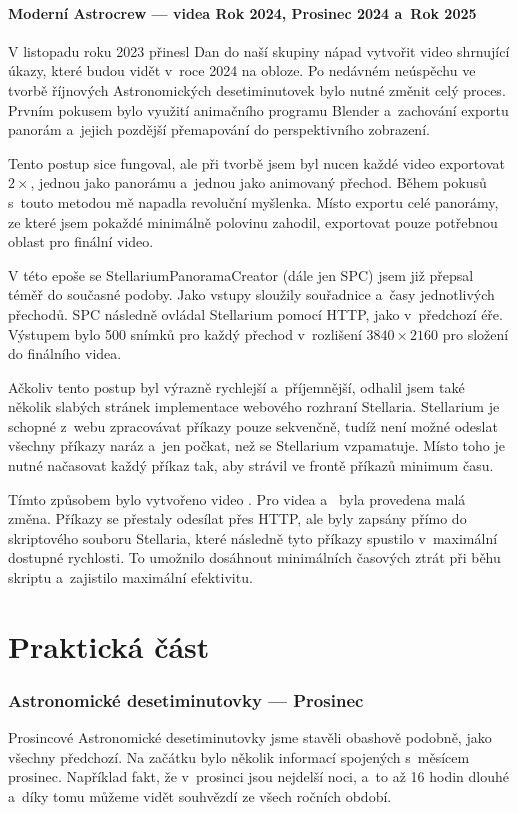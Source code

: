 \documentclass[12pt,a4paper,titlepage]{article}
\begin{document}
\subsection{Moderní Astrocrew --- videa Rok 2024, Prosinec 2024 a~Rok 2025}
V listopadu roku 2023 přinesl Dan do naší skupiny nápad vytvořit video shrnující úkazy, které budou vidět v~roce 2024 na obloze. Po nedávném neúspěchu ve tvorbě říjnových Astronomických desetiminutovek bylo nutné změnit celý proces. Prvním pokusem bylo využití animačního programu Blender a~zachování exportu panorám a~jejich pozdější přemapování do perspektivního zobrazení. 

Tento postup sice fungoval, ale při tvorbě jsem byl nucen každé video exportovat \(2\times \), jednou jako panorámu a~jednou jako animovaný přechod. Během pokusů s~touto metodou mě napadla revoluční myšlenka. Místo exportu celé panorámy, ze které jsem pokaždé minimálně polovinu zahodil, exportovat pouze potřebnou oblast pro finální video. 

V této epoše se StellariumPanoramaCreator (dále jen SPC) jsem již přepsal téměř do současné podoby. Jako vstupy sloužily souřadnice a~časy jednotlivých přechodů. SPC následně ovládal Stellarium pomocí HTTP, jako v~předchozí éře. Výstupem bylo 500 snímků pro každý přechod v~rozlišení \(3840\times2160\) pro složení do finálního videa. 

Ačkoliv tento postup byl výrazně rychlejší a~příjemnější, odhalil jsem také několik slabých stránek implementace webového rozhraní Stellaria. Stellarium je schopné z~webu zpracovávat příkazy pouze sekvenčně, tudíž není možné odeslat všechny příkazy naráz a~jen počkat, než se Stellarium vzpamatuje. Místo toho je nutné načasovat každý příkaz tak, aby strávil ve frontě příkazů minimum času. 

Tímto způsobem bylo vytvořeno video . Pro videa  a~ byla provedena malá změna. Příkazy se přestaly odesílat přes HTTP, ale byly zapsány přímo do skriptového souboru Stellaria, které následně tyto příkazy spustilo v~maximální dostupné rychlosti. To umožnilo dosáhnout minimálních časových ztrát při běhu skriptu a~zajistilo maximální efektivitu.
\newpage
\part{Praktická část}
\section{Astronomické desetiminutovky --- Prosinec}
Prosincové Astronomické desetiminutovky jsme stavěli obashově podobně, jako všechny předchozí. Na začátku bylo několik informací spojených s~měsícem prosinec. Například fakt, že v~prosinci jsou nejdelší noci, a~to až 16 hodin dlouhé a~díky tomu můžeme vidět souhvězdí ze všech ročních období. 
\end{document}
